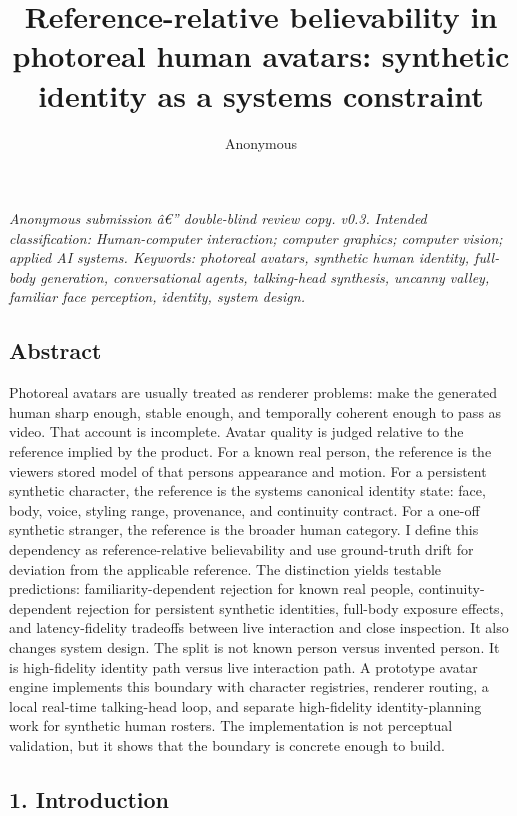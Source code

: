 \documentclass[
]{article}
\title{Reference-relative believability in photoreal human avatars:
synthetic identity as a systems constraint}
\author{Anonymous}
\date{}
\begin{document}
\maketitle

\emph{Anonymous submission â€'' double-blind review copy. v0.3.}
\emph{Intended classification: Human-computer interaction; computer
graphics; computer vision; applied AI systems. Keywords: photoreal
avatars, synthetic human identity, full-body generation, conversational
agents, talking-head synthesis, uncanny valley, familiar face
perception, identity, system design.}

\subsection{Abstract}\label{abstract}

Photoreal avatars are usually treated as renderer problems: make the
generated human sharp enough, stable enough, and temporally coherent
enough to pass as video. That account is incomplete. Avatar quality is
judged relative to the reference implied by the product. For a known
real person, the reference is the viewer\textquotesingle s stored model
of that person\textquotesingle s appearance and motion. For a persistent
synthetic character, the reference is the system\textquotesingle s
canonical identity state: face, body, voice, styling range, provenance,
and continuity contract. For a one-off synthetic stranger, the reference
is the broader human category. I define this dependency as
reference-relative believability and use ground-truth drift for
deviation from the applicable reference. The distinction yields testable
predictions: familiarity-dependent rejection for known real people,
continuity-dependent rejection for persistent synthetic identities,
full-body exposure effects, and latency-fidelity tradeoffs between live
interaction and close inspection. It also changes system design. The
split is not known person versus invented person. It is high-fidelity
identity path versus live interaction path. A prototype avatar engine
implements this boundary with character registries, renderer routing, a
local real-time talking-head loop, and separate high-fidelity
identity-planning work for synthetic human rosters. The implementation
is not perceptual validation, but it shows that the boundary is concrete
enough to build.

\subsection{1. Introduction}\label{1-introduction}
\end{document}
